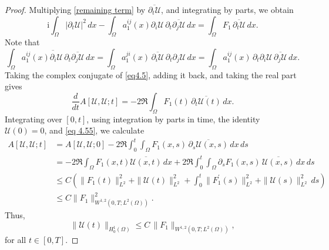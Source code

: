 \documentclass[11pt,reqno,oneside]{amsart}
\numberwithin{equation}{section}
\theoremstyle{definition}
\theoremstyle{remark}
\numberwithin{equation}{section}
\begin{document}
\begin{proof}
		Multiplying \eqref{remaining term} by $\overline{\partial_t\mathcal{U}}$, and integrating by parts, we obtain
		\begin{equation}\label{eq4.5}
			\mathrm{i}\int_{\Omega}|\partial_{t}\mathcal{U}|^{2}\,dx
			-\int_{\Omega}a^{ij}_{1}(x)\partial_{i}\mathcal{U}\,
			\partial_{t}\overline{\partial_{j}\mathcal{U}}\,dx
			=\int_{\Omega}F_1\,\overline{\partial_t\mathcal{U}}\,dx.
		\end{equation}
		Note that
		\[
		\int_{\Omega}\overline{
			a^{ij}_1(x)\partial_i\mathcal{U}\,
			\partial_{t}\overline{\partial_{j}\mathcal{U}}}\,dx
		=
		\int_{\Omega}a^{ji}_{1}(x)\,\overline{\partial_{i}\mathcal{U}}\,
		\partial_{t}\partial_{j}\mathcal{U}\,dx
		=
		\int_{\Omega}a^{ij}_{1}(x)\,
		\partial_{t}\partial_{i}\mathcal{U}\,
		\overline{\partial_{j}\mathcal{U}}\,dx .
		\]
		Taking the complex conjugate of \eqref{eq4.5}, adding it back, and taking the real part gives
		\[
		\frac{d}{dt}A[\mathcal{U},\mathcal{U};t]
		= -2\Re\int_{\Omega}F_1(t)\,
		\overline{\partial_t\mathcal{U}(t)}\,dx .
		\]
		Integrating over $[0,t]$, using integration by parts in time, the identity $\mathcal{U}(0)=0$, and \eqref{eq 4.55}, we calculate
		\[
		\begin{aligned}
			A[\mathcal{U},\mathcal{U};t]
			&= A[\mathcal{U},\mathcal{U};0]
			-2\Re\int_{0}^{t}\int_{\Omega}
			F_1(x,s)\,\overline{\partial_s\mathcal{U}(x,s)}\,dx\,ds 
			\\
			&= -2\Re\int_{\Omega}F_1(x,t)\overline{\mathcal{U}(x,t)}\,dx
			+2\Re\int_{0}^{t}\int_{\Omega}
			\partial_sF_1(x,s)\,\overline{\mathcal{U}(x,s)}\,dx\,ds
			\\
			&\le C\left(\|F_1(t)\|_{L^{2}}^{2}
			+\|\mathcal{U}(t)\|_{L^{2}}^{2}
			+\int_{0}^{t}\|F_1^{\prime}(s)\|_{L^{2}}^{2}
			+\|\mathcal{U}(s)\|_{L^{2}}^{2}\,ds \right)
			\\
			&\le C\|F_1\|_{W^{1,2}(0,T;L^{2}(\Omega))}^{2}.
		\end{aligned}
		\]
		Thus,
		\begin{equation}\label{eq 4.8}
			\|\mathcal{U}(t)\|_{H^{1}_{0}(\Omega)}
			\le C\,\|F_1\|_{W^{1,2}(0,T;L^{2}(\Omega))},
		\end{equation}
		for all $t\in[0,T]$.
		

\end{proof}
\end{document}
